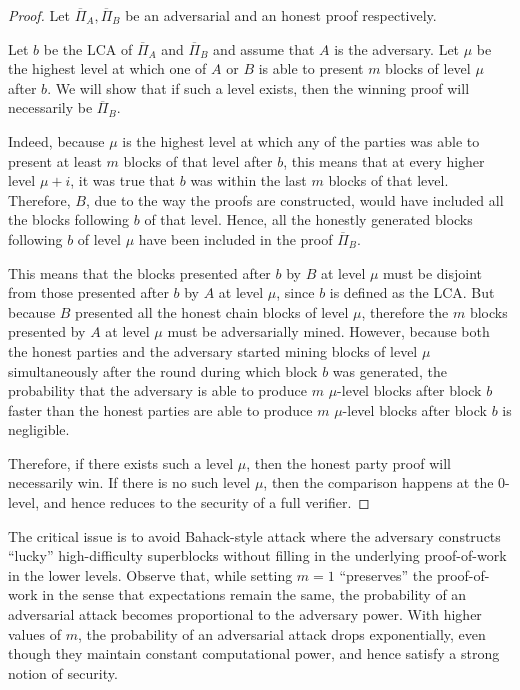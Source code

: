 \begin{proof}
    Let $\overline{\Pi}_A, \overline{\Pi}_B$ be an adversarial and an honest
    proof respectively.

    Let $b$ be the LCA of $\overline{\Pi}_A$ and $\overline{\Pi}_B$ and assume
    that $A$ is the adversary. Let $\mu$ be the highest level at which one of $A$
    or $B$ is able to present $m$ blocks of level $\mu$ after $b$. We will show
    that if such a level exists, then the winning proof will necessarily be
    $\overline{\Pi}_B$.

    Indeed, because $\mu$ is the highest level at which any of the parties was
    able to present at least $m$ blocks of that level after $b$, this means
    that at every higher level $\mu + i$, it was true that $b$ was within the
    last $m$ blocks of that level. Therefore, $B$, due to the way the proofs
    are constructed, would have included all the blocks following $b$ of that
    level. Hence, all the honestly generated blocks following $b$ of level
    $\mu$ have been included in the proof $\overline{\Pi}_B$.

    This means that the blocks presented after $b$ by $B$ at level $\mu$ must
    be disjoint from those presented after $b$ by $A$ at level $\mu$, since $b$
    is defined as the LCA. But because $B$ presented all the honest chain
    blocks of level $\mu$, therefore the $m$ blocks presented by $A$ at level
    $\mu$ must be adversarially mined.  However, because both the honest
    parties and the adversary started mining blocks of level $\mu$
    simultaneously after the round during which block $b$ was generated, the
    probability that the adversary is able to produce $m$ $\mu$-level blocks
    after block $b$ faster than the honest parties are able to produce $m$
    $\mu$-level blocks after block $b$ is negligible.

    Therefore, if there exists such a level $\mu$, then the honest party proof
    will necessarily win. If there is no such level $\mu$, then the comparison
    happens at the 0-level, and hence reduces to the security of a full
    verifier.
\end{proof}

The critical issue is to avoid Bahack-style attack \cite{bahack} where the
adversary constructs ``lucky'' high-difficulty superblocks without filling in
the underlying proof-of-work in the lower levels. Observe that, while setting
$m = 1$ ``preserves'' the proof-of-work in the sense that expectations remain
the same, the probability of an adversarial attack becomes proportional to the
adversary power. With higher values of $m$, the probability of an adversarial
attack drops exponentially, even though they maintain constant computational
power, and hence satisfy a strong notion of security.

